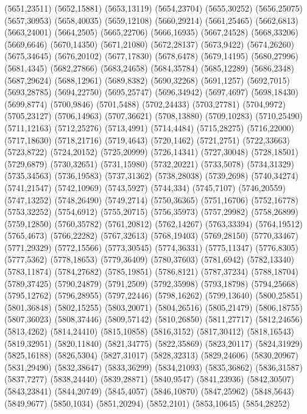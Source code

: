 (5651,23511)
(5652,15881)
(5653,13119)
(5654,23704)
(5655,30252)
(5656,25075)
(5657,30953)
(5658,40035)
(5659,12108)
(5660,29214)
(5661,25465)
(5662,6813)
(5663,24001)
(5664,2505)
(5665,22706)
(5666,16935)
(5667,24528)
(5668,33206)
(5669,6646)
(5670,14350)
(5671,21080)
(5672,28137)
(5673,9422)
(5674,26260)
(5675,34645)
(5676,20102)
(5677,17830)
(5678,6478)
(5679,14195)
(5680,27996)
(5681,4345)
(5682,27866)
(5683,24658)
(5684,35784)
(5685,12289)
(5686,2348)
(5687,29624)
(5688,12961)
(5689,8382)
(5690,32268)
(5691,1257)
(5692,7015)
(5693,28785)
(5694,22750)
(5695,25747)
(5696,34942)
(5697,4697)
(5698,18430)
(5699,8774)
(5700,9846)
(5701,5488)
(5702,24433)
(5703,27781)
(5704,9972)
(5705,23127)
(5706,14963)
(5707,36621)
(5708,13880)
(5709,10283)
(5710,25490)
(5711,12163)
(5712,25276)
(5713,4991)
(5714,4484)
(5715,28275)
(5716,22000)
(5717,18630)
(5718,21716)
(5719,4643)
(5720,1462)
(5721,2751)
(5722,33663)
(5723,8722)
(5724,20152)
(5725,20999)
(5726,14341)
(5727,30048)
(5728,18501)
(5729,6879)
(5730,32651)
(5731,15980)
(5732,20221)
(5733,5078)
(5734,31329)
(5735,34563)
(5736,19583)
(5737,31362)
(5738,28038)
(5739,2698)
(5740,34274)
(5741,21547)
(5742,10969)
(5743,5927)
(5744,334)
(5745,7107)
(5746,20559)
(5747,13252)
(5748,26490)
(5749,2714)
(5750,36365)
(5751,16706)
(5752,16778)
(5753,32252)
(5754,6912)
(5755,20715)
(5756,35973)
(5757,29982)
(5758,26899)
(5759,12850)
(5760,35782)
(5761,20812)
(5762,14267)
(5763,33394)
(5764,19512)
(5765,4673)
(5766,22282)
(5767,32613)
(5768,19403)
(5769,28150)
(5770,33467)
(5771,29329)
(5772,15566)
(5773,30545)
(5774,36331)
(5775,11347)
(5776,8305)
(5777,5362)
(5778,18653)
(5779,36409)
(5780,37603)
(5781,6942)
(5782,13340)
(5783,11874)
(5784,27682)
(5785,19851)
(5786,8121)
(5787,37234)
(5788,18704)
(5789,37425)
(5790,24879)
(5791,2509)
(5792,35998)
(5793,18798)
(5794,25668)
(5795,12762)
(5796,28955)
(5797,22446)
(5798,16262)
(5799,13640)
(5800,25851)
(5801,36848)
(5802,15255)
(5803,20071)
(5804,26516)
(5805,21479)
(5806,18755)
(5807,36023)
(5808,37446)
(5809,57142)
(5810,26850)
(5811,27717)
(5812,24656)
(5813,4262)
(5814,24410)
(5815,10858)
(5816,3152)
(5817,30412)
(5818,16543)
(5819,32951)
(5820,11840)
(5821,34775)
(5822,35869)
(5823,20117)
(5824,31929)
(5825,16188)
(5826,5304)
(5827,31017)
(5828,32313)
(5829,24606)
(5830,20967)
(5831,29490)
(5832,38647)
(5833,36299)
(5834,21093)
(5835,36862)
(5836,31587)
(5837,7277)
(5838,24440)
(5839,28871)
(5840,9547)
(5841,23936)
(5842,30507)
(5843,23841)
(5844,20749)
(5845,4057)
(5846,10870)
(5847,25962)
(5848,5643)
(5849,9677)
(5850,1034)
(5851,20294)
(5852,2101)
(5853,10645)
(5854,28252)
